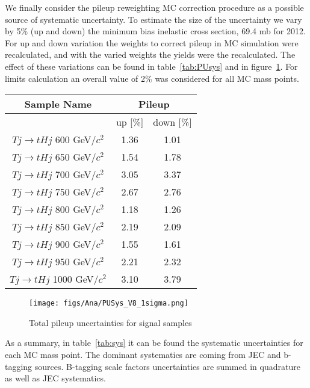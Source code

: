 We finally consider the pileup reweighting MC correction procedure as a possible source of systematic uncertainty. To estimate the size of the uncertainty we vary by 5\% (up and down) the minimum bias inelastic cross section, 69.4 mb for 2012. For up and down variation the weights to correct pileup in MC simulation were recalculated, and with the varied weights the yields were the recalculated. The effect of these variations can be found in table~\ref{tab:PUsys} and in figure~\ref{fig:TotalPUSys}. For limits calculation an overall value of 2\% was considered for all MC mass points.

\begin{table*}[htbH]
\begin{center}
\begin{tabular}{|c|c|c|}
\hline 
Sample Name & \multicolumn{2}{c|}{Pileup} \\
\hline
 & up [\%] & down [\%] \\
\hline
$Tj\rightarrow tHj$ 600 GeV/$c^{2}$ & 1.36 & 1.01 \\
$Tj\rightarrow tHj$ 650 GeV/$c^{2}$ & 1.54 & 1.78 \\
$Tj\rightarrow tHj$ 700 GeV/$c^{2}$ & 3.05 & 3.37 \\
$Tj\rightarrow tHj$ 750 GeV/$c^{2}$ & 2.67 & 2.76 \\
$Tj\rightarrow tHj$ 800 GeV/$c^{2}$ & 1.18 & 1.26 \\
$Tj\rightarrow tHj$ 850 GeV/$c^{2}$ & 2.19 & 2.09 \\
$Tj\rightarrow tHj$ 900 GeV/$c^{2}$ & 1.55 & 1.61 \\
$Tj\rightarrow tHj$ 950 GeV/$c^{2}$ & 2.21 & 2.32 \\
$Tj\rightarrow tHj$ 1000 GeV/$c^{2}$ & 3.10 & 3.79 \\
\hline
\end{tabular}
\caption{Pileup uncertainties for signal samples\label{tab:PUsys}}
\end{center}
\end{table*}

\begin{figure}[!Hhtbp]
  \begin{center}
    \texttt{[image: figs/Ana/PUSys\_V8\_1sigma.png]}
    \caption{Total pileup uncertainties for signal samples}
    \label{fig:TotalPUSys}
  \end{center}
\end{figure}

As a summary, in table~\ref{tab:sys} it can be found the systematic uncertainties for each MC mass point. The dominant systematics are coming from JEC and b-tagging sources. B-tagging scale factors uncertainties are summed in quadrature as well as JEC systematics.

